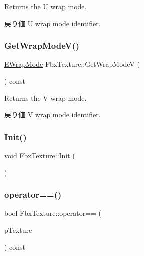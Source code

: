 Returns the U wrap mode. \begin{DoxyReturn}{戻り値}
U wrap mode identifier. 
\end{DoxyReturn}
\mbox{\label{class_fbx_texture_abf31cda728e2ff7f94e10dca19de19d2}} 
\subsubsection{\texorpdfstring{Get\+Wrap\+Mode\+V()}{GetWrapModeV()}}
{\footnotesize\ttfamily \hyperlink{class_fbx_texture_ae273dffe3ff532dfd57e7bdb15b121fd}{E\+Wrap\+Mode} Fbx\+Texture\+::\+Get\+Wrap\+ModeV (\begin{DoxyParamCaption}{ }\end{DoxyParamCaption}) const}

Returns the V wrap mode. \begin{DoxyReturn}{戻り値}
V wrap mode identifier. 
\end{DoxyReturn}
\mbox{\label{class_fbx_texture_a2e0e1f9bca241abf56d471168a93c5fc}} 
\subsubsection{\texorpdfstring{Init()}{Init()}}
{\footnotesize\ttfamily void Fbx\+Texture\+::\+Init (\begin{DoxyParamCaption}{ }\end{DoxyParamCaption})\hspace{0.3cm}{\ttfamily [protected]}}

\mbox{\label{class_fbx_texture_a65138a2a6eb3226ea7d3f0e9384c23a4}} 
\subsubsection{\texorpdfstring{operator==()}{operator==()}}
{\footnotesize\ttfamily bool Fbx\+Texture\+::operator== (\begin{DoxyParamCaption}\item[{\hyperlink{class_fbx_texture}{Fbx\+Texture} const \&}]{p\+Texture }\end{DoxyParamCaption}) const}

